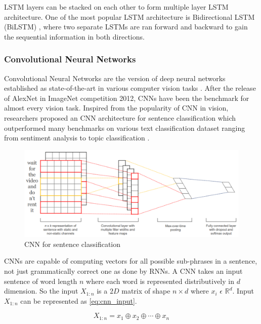 LSTM layers can be stacked on each other to form multiple layer LSTM architecture. One of the most popular LSTM architecture is Bidirectional LSTM (BiLSTM) \cite{graves2013hybrid}, where two separate LSTMs are ran forward and backward to gain the sequential information in both directions.

\subsubsection{Convolutional Neural Networks}
Convolutional Neural Networks \cite{lecun1998gradient} are the version of deep neural networks established as state-of-the-art in various computer vision tasks \cite{barbu2019objectnet,ali2019mfc}. After the release of AlexNet \cite{krizhevsky2012imagenet} in ImageNet competition 2012, CNNs have been the benchmark for almost every vision task. Inspired from the popularity of CNN in vision, researchers proposed an CNN architecture for sentence classification which outperformed many benchmarks on various text classification dataset ranging from sentiment analysis to topic classification \cite{kim2014convolutional}. 

\begin{figure}
    \centering
    \includegraphics[width=\textwidth]{images/cnn_text.png}
    \caption{CNN for sentence classification}
    \label{fig:cnn}
\end{figure}

CNNs are capable of computing vectors for all possible sub-phrases in a sentence, not just grammatically correct one as done by RNNs. A CNN takes an input sentence of word length $n$ where each word is represented distributively in $d$ dimension. So the input $X_{1:n}$ is a $2D$ matrix of shape $n \times d$  where $x_{i}$ $\epsilon$ $\mathbb{R}^d$. Input $X_{1:n}$ can be represented as \cref{eq:cnn_input}.

\begin{equation}
    \label{eq:cnn_input}
    X_{1:n} = x_{1} \oplus x_{2} \oplus \cdots \oplus x_{n}
\end{equation}

